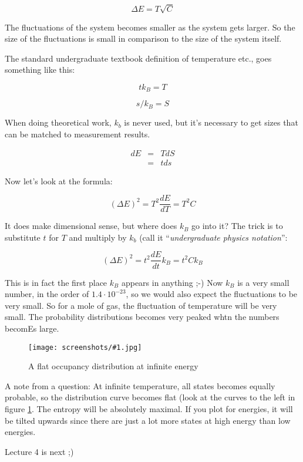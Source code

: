 \documentclass[a4, 12pt, english, USenglish]{scrreprt}
\newcommand{\screenshot}[2]{
\begin{figure}[htb]
\texttt{[image: screenshots/\#1.jpg]}
\label{#1}
\caption{#2}
\end{figure}}
\newcommand{\parens}[1]{\ensuremath{\left({#1}\right)}}
\newcommand{\idx}[1]{{\em #1}\index{#1}}
\begin{document}
\[
  \Delta E= T \sqrt{C}
\]

The fluctuations of the system becomes smaller as the system gets
larger.  So the size of the fluctuations is small in comparison to the
size of the system itself.

The standard undergraduate textbook definition of temperature etc.,
goes something like this:

\[
   t k_B = T
\]


\[
  s/k_B = S
\]

When doing theoretical work, \(k_b\) is never used, but it's necessary
to get sizes that  can be matched to measurement results.

\[
\begin{array}{lcl}
 d E &=& T dS \\
&=& t ds
\end{array}
\]

Now let's look at the formula:

\[
\parens{\Delta E}^2 = T^2 \frac{dE}{dT} = T^2 C
\]

It does make dimensional sense, but where does \(k_B\) go into it? The
trick is to substitute \(t\) for \(T\) and multiply by \(k_b\) (call
it ``\idx{undergraduate physics notation}'':

\[
\parens{\Delta E}^2 =  t^2 \frac{dE}{dt} k_B = t^2 C k_B
\] 

This is in fact the first place \(k_B\) appears in anything ;-)    Now
\(k_B\) is a very small number, in the order of \(1.4 \cdot 10^{-23}\), so we
would also expect the fluctuations to be very small.  So for a mole of
gas, the fluctuation of temperature will be very small.  The
probability distributions becomes very peaked whtn the numbers becomEs large.

\screenshot{flatdistribution}{A flat occupancy distribution at infinite energy}
A note from a question:  At infinite temperature, all states becomes
equally probable, so the distribution curve becomes flat (look at the
curves to the left in figure \ref{flatdistribution}.  The entropy will
be absolutely maximal.  If you plot for energies, it will be tilted
upwards since there are just a lot more states at high energy than low energies.

Lecture 4 is next ;)

\printindex
\end{document}
